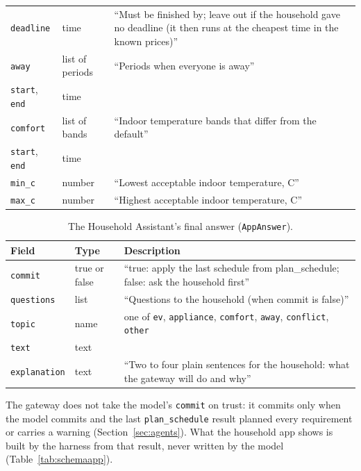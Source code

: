 \begin{table}[htbp]
\begin{tabularx}{\textwidth}{@{}>{\raggedright\arraybackslash}p{3.3cm}>{\raggedright\arraybackslash}p{2.4cm}X@{}}
\quad\texttt{deadline} & time & ``Must be finished by; leave out if the household gave no deadline (it then runs at the cheapest time in the known prices)'' \\
\texttt{away} & list of periods & ``Periods when everyone is away'' \\
\quad\texttt{start}, \texttt{end} & time & \\
\texttt{comfort} & list of bands & ``Indoor temperature bands that differ from the default'' \\
\quad\texttt{start}, \texttt{end} & time & \\
\quad\texttt{min\_c} & number & ``Lowest acceptable indoor temperature, C'' \\
\quad\texttt{max\_c} & number & ``Highest acceptable indoor temperature, C'' \\
\bottomrule
\end{tabularx}
\end{table}

\begin{table}[htbp]
\caption{The Household Assistant's final answer (\texttt{AppAnswer}).}
\label{tab:schemaanswer}
\small
\begin{tabularx}{\textwidth}{@{}>{\raggedright\arraybackslash}p{3.3cm}>{\raggedright\arraybackslash}p{2.4cm}X@{}}
\toprule
Field & Type & Description \\
\midrule
\texttt{commit} & true or false & ``true: apply the last schedule from plan\_schedule; false: ask the household first'' \\
\texttt{questions} & list & ``Questions to the household (when commit is false)'' \\
\quad\texttt{topic} & name & one of \texttt{ev}, \texttt{appliance}, \texttt{comfort}, \texttt{away}, \texttt{conflict}, \texttt{other} \\
\quad\texttt{text} & text & \\
\texttt{explanation} & text & ``Two to four plain sentences for the household: what the gateway will do and why'' \\
\bottomrule
\end{tabularx}
\end{table}

The gateway does not take the model's \texttt{commit} on trust: it
commits only when the model commits and the last
\texttt{plan\_schedule} result planned every requirement or carries a
warning (Section~\ref{sec:agents}). What the household app shows is
built by the harness from that result, never written by the model
(Table~\ref{tab:schemaapp}).

